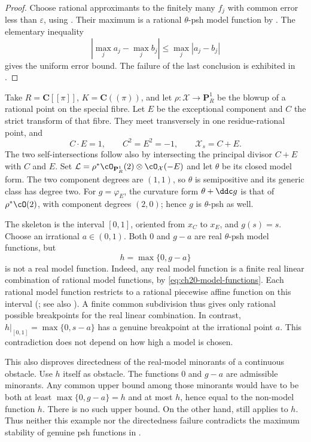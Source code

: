 \begin{proof}
Choose rational approximants to the finitely many $f_j$ with common
error less than $\varepsilon$, using
.  Their maximum is a
rational $\theta$-psh model function by .
The elementary inequality
\[
 \left|\max_j a_j-\max_j b_j\right|\leq\max_j|a_j-b_j|
\]
gives the uniform error bound.  The failure of the last conclusion is
exhibited in .
\end{proof}

\begin{example}
\label{ex:ch20-real-max-irrational-breakpoint}
Take $R=\mathbf C[[\pi]]$, $K=\mathbf C((\pi))$, and let
$\rho:\mathcal X\to\mathbf P^1_R$ be the blowup of a rational point
on the special fibre.  Let $E$ be the exceptional component and $C$
the strict transform of that fibre.  They meet transversely in one
residue-rational point, and
\[
 C\cdot E=1,\qquad C^2=E^2=-1,\qquad \mathcal X_s=C+E.
\]
The two self-intersections follow also by intersecting the principal
divisor $C+E$ with $C$ and $E$.  Set
$\mathcal L=\rho^*\cO_{\mathbf P^1_R}(2)\otimes\cO_{\mathcal X}(-E)$
and let $\theta$ be its closed model form.  The two component degrees
are $(1,1)$, so $\theta$ is semipositive and its generic class has
degree two.  For $g=\varphi_E$, the curvature form
$\theta+\ddc g$ is that of $\rho^*\cO(2)$, with component degrees
$(2,0)$; hence $g$ is $\theta$-psh as well.

The skeleton is the interval $[0,1]$, oriented from $x_C$ to
$x_E$, and $g(s)=s$.  Choose an irrational $a\in(0,1)$.
Both $0$ and $g-a$ are real $\theta$-psh model functions, but
\[
                    h=\max\{0,g-a\}
\]
is not a real model function.  Indeed, any real model function is a
finite real linear combination of rational model functions, by
\eqref{eq:ch20-model-functions}.  Each rational model function restricts
to a rational piecewise affine function on this interval
(; see also
\cite[Proposition~3.12 and Corollary~3.13]{BFJ16}).  A finite common
subdivision thus gives only rational possible breakpoints for the real
linear combination.  In contrast, $h|_{[0,1]}=\max\{0,s-a\}$ has a
genuine breakpoint at the irrational point $a$.  This contradiction
does not depend on how high a model is chosen.

This also disproves directedness of the real-model minorants of a
continuous obstacle.  Use $h$ itself as obstacle.  The functions
$0$ and $g-a$ are admissible minorants.  Any common upper bound
among those minorants would have to be both at least
$\max\{0,g-a\}=h$ and at most $h$, hence equal to the non-model
function $h$.  There is no such upper bound.  On the other hand,
 still applies to $h$.
Thus neither this example nor the directedness failure contradicts the
maximum stability of genuine psh functions in
.
\end{example}

